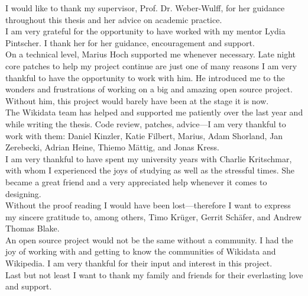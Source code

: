 I would like to thank my supervisor, Prof. Dr. Weber-Wulff, for her guidance throughout this thesis and her advice on academic practice. \\

I am very grateful for the opportunity to have worked with my mentor Lydia Pintscher. I thank her for her guidance, encouragement and support. \\

On a technical level, Marius Hoch supported me whenever necessary. Late night core patches to help my project continue are just one of many reasons I am very thankful to have the opportunity to work with him. He introduced me to the wonders and frustrations of working on a big and amazing open source project. Without him, this project would barely have been at the stage it is now. \\

The Wikidata team has helped and supported me patiently over the last year and while writing the thesis. Code review, patches, advice---I am very thankful to work with them: Daniel Kinzler, Katie Filbert, Marius, Adam Shorland, Jan Zerebecki, Adrian Heine, Thiemo Mättig, and Jonas Kress.  \\

I am very thankful to have spent my university years with Charlie Kritschmar, with whom I experienced the joys of studying as well as the stressful times. She became a great friend and a very appreciated help whenever it comes to designing. \\ 

Without the proof reading I would have been lost---therefore I want to express my sincere gratitude to, among others, Timo Krüger, Gerrit Schäfer, and Andrew Thomas Blake. \\

An open source project would not be the same without a community. I had the joy of working with and getting to know the communities of Wikidata and Wikipedia. I am very thankful for their input and interest in this project. \\

Last but not least I want to thank my family and friends for their everlasting love and support.